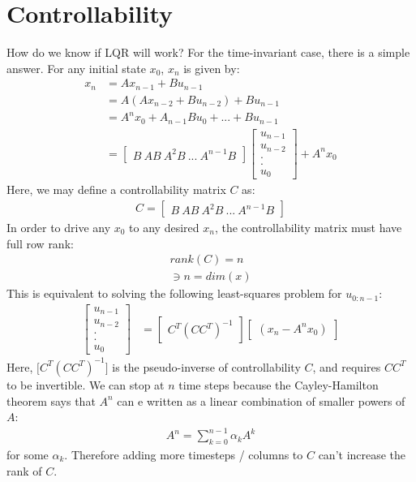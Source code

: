 \section{Controllability}
How do we know if LQR will work? For the time-invariant case, there is a simple answer. For any initial state $x_0$, $x_n$ is given by: 
\begin{align}
    x_n &= A x_{n-1} + B u_{n-1} \\
    &= A (Ax_{n-2} + B u_{n-2}) + B u_{n-1} \\
    &= A^n x_0 + A_{n-1} B u_0 + ... + B u_{n-1}\\
    &= \begin{bmatrix}
        B \ AB \ A^2 B \ ... \ A^{n-1} B 
    \end{bmatrix} 
    \begin{bmatrix}
        u_{n-1} \\
        u_{n-2} \\
        . \\
        . \\
        u_0
    \end{bmatrix}
    + 
    A^n x_0
\end{align}
Here, we may define a controllability matrix $C$ as: 
\begin{align}
    C = \begin{bmatrix}
        B \ AB \ A^2 B \ ... \ A^{n-1} B 
    \end{bmatrix} 
\end{align}
In order to drive any $x_0$ to any desired $x_n$, the controllability matrix must have full row rank: 
\begin{align}
    rank(C) = n \\
    \ni n = dim(x)
\end{align}
This is equivalent to solving the following least-squares problem for $u_{0:n-1}$: 
\begin{align}
    \begin{bmatrix}
        u_{n-1} \\
        u_{n-2} \\
        . \\
        . \\
        u_0
    \end{bmatrix}
    &= 
    \begin{bmatrix}
        C^T (C C^T)^{-1} 
    \end{bmatrix}
    \begin{bmatrix}
        (x_n - A^n x_0)
    \end{bmatrix}
\end{align}
Here, $\big[ C^T (C C^T)^{-1} \big]$ is the pseudo-inverse of controllability $C$, and requires $C C^T$ to be invertible. 
We can stop at $n$ time steps because the Cayley-Hamilton theorem says that $A^n$ can e written as a linear combination of smaller powers of $A$: 
\begin{align}
    A^n = \sum_{k=0}^{n-1} \alpha_k A^k 
\end{align}
for some $\alpha_k$.
Therefore adding more timesteps / columns to $C$ can't increase the rank of $C$. 